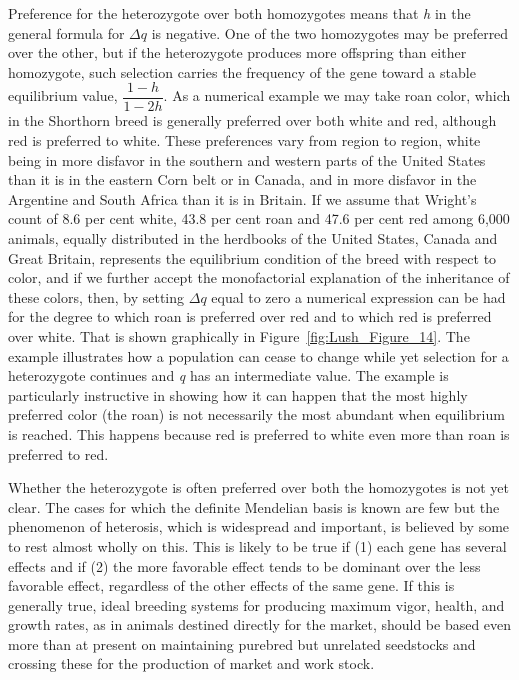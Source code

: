 Preference for the heterozygote over both homozygotes means that \textit{h}
in the general formula for $\Delta q$ is negative. One of the two homozygotes
may be preferred over the other, but if the heterozygote produces more
offspring than either homozygote, such selection carries the frequency
of the gene toward a stable equilibrium value, $\dfrac{1-h}{1-2h}$. As a
numerical example we may take roan color, which in the Shorthorn breed is generally
preferred over both white and red, although red is preferred to
white. These preferences vary from region to region, white being in
more disfavor in the southern and western parts of the United States
than it is in the eastern Corn belt or in Canada, and in more disfavor in
the Argentine and South Africa than it is in Britain. If we assume that
Wright's count of 8.6 per cent white, 43.8 per cent roan and 47.6 per
cent red among 6,000 animals, equally distributed in the herdbooks of
the United States, Canada and Great Britain, represents the equilibrium
condition of the breed with respect to color, and if we further accept
the monofactorial explanation of the inheritance of these colors, then,
by setting $\Delta q$ equal to zero a numerical expression can be had for the
degree to which roan is preferred over red and to which red is preferred
over white. That is shown graphically in Figure~\ref{fig:Lush_Figure_14}. The
example illustrates how a population can cease to change while yet selection for a
heterozygote continues and \textit{q} has an intermediate value. The example
is particularly instructive in showing how it can happen that the most
highly preferred color (the roan) is not necessarily the most abundant
when equilibrium is reached. This happens because red is preferred to
white even more than roan is preferred to red.

Whether the heterozygote is often preferred over both the homozygotes is not
yet clear. The cases for which the definite Mendelian basis is known are few
but the phenomenon of heterosis, which is widespread and important, is believed
by some to rest almost wholly on this. This is likely to be true if (1) each
gene has several effects and if (2) the more favorable effect tends to be dominant
over the less favorable effect, regardless of the other effects of the same gene.
If this is generally true, ideal breeding systems for producing maximum vigor,
health, and growth rates, as in animals destined directly for the market, should
 be based even more than at present on maintaining purebred but unrelated seedstocks
 and crossing these for the production of market and work stock.

